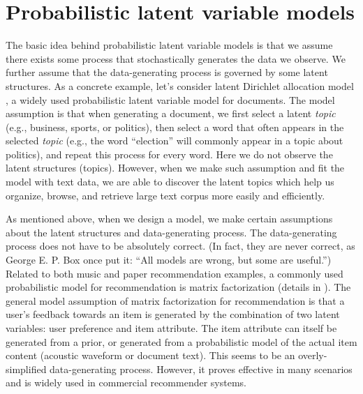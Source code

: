 \section{Probabilistic latent variable models}\label{chpt:intro:sec:model}

The basic idea behind probabilistic latent variable models is that we assume there exists some process that stochastically generates the data we observe. We further assume that the data-generating process is governed by some latent structures. As a concrete example, let's consider latent Dirichlet allocation model \citep{blei2003latent}, a widely used probabilistic latent variable model for documents. The model assumption is that when generating a document, we first select a latent \textit{topic} (e.g., business, sports, or politics), then select a word that often appears in the selected \textit{topic} (e.g., the word ``election'' will commonly appear in a topic about politics), and repeat this process for every word. Here we do not observe the latent structures (topics). However, when we make such assumption and fit the model with text data, we are able to discover the latent topics which help us organize, browse, and retrieve large text corpus more easily and efficiently. 

As mentioned above, when we design a model, we make certain assumptions about the latent structures and data-generating process. The data-generating process does not have to be absolutely correct. (In fact, they are never correct, as George E. P. Box once put it: ``All models are wrong, but some are useful.'') Related to both music and paper recommendation examples, a commonly used probabilistic model for recommendation is matrix factorization (details in ). The general model assumption of matrix factorization for recommendation is that a user's feedback towards an item is generated by the combination of two latent variables: user preference and item attribute. The item attribute can itself be generated from a prior, or generated from a probabilistic model of the actual item content (acoustic waveform or document text). This seems to be an overly-simplified data-generating process. However, it proves effective in many scenarios and is widely used in commercial recommender systems. 

